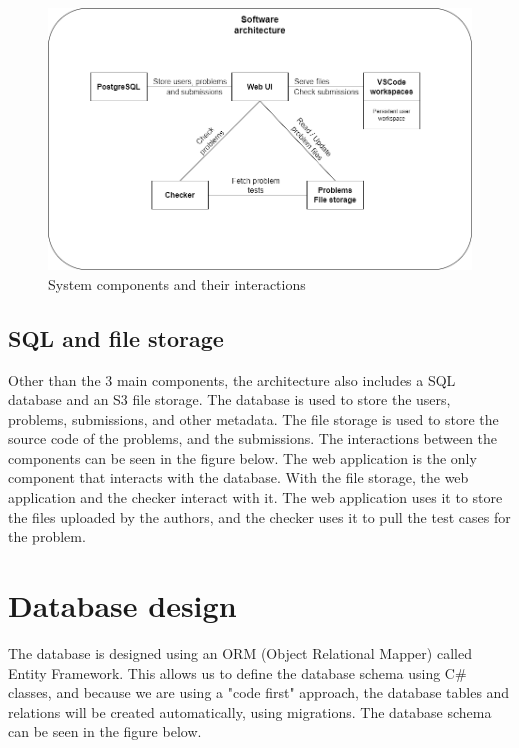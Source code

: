\documentclass[12pt,a4paper]{report}
\begin{document}
\begin{figure}[h]
	\centering
	\includegraphics[width=\linewidth]{../photos/software-architecture.png}
	\caption{System components and their interactions}
	\label{fig:system-components}
\end{figure}

\subsection{SQL and file storage}
Other than the 3 main components, the architecture also includes a SQL database and an S3 file storage. The database is used to store the users, problems, submissions, and other metadata. The file storage is used to store the source code of the problems, and the submissions. The interactions between the components can be seen in the figure below. The web application is the only component that interacts with the database. With the file storage, the web application and the checker interact with it. The web application uses it to store the files uploaded by the authors, and the checker uses it to pull the test cases for the problem.


\section{Database design}
The database is designed using an ORM (Object Relational Mapper) called Entity Framework. This allows us to define the database schema using C\# classes, and because we are using a "code first" approach, the database tables and relations will be created automatically, using migrations. The database schema can be seen in the figure below. 
\end{document}
